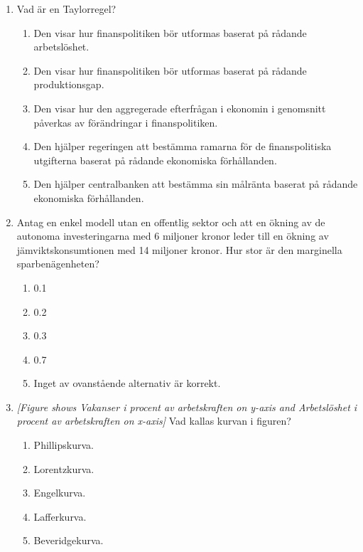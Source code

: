 \documentclass[12pt,a4paper]{article}
\begin{document}
\begin{enumerate}[label=\arabic*.]
    \item Vad är en Taylorregel?
    \begin{enumerate}[label=\alph*)]
        \item Den visar hur finanspolitiken bör utformas baserat på rådande arbetslöshet.
        \item Den visar hur finanspolitiken bör utformas baserat på rådande produktionsgap.
        \item Den visar hur den aggregerade efterfrågan i ekonomin i genomsnitt påverkas av förändringar i finanspolitiken.
        \item Den hjälper regeringen att bestämma ramarna för de finanspolitiska utgifterna baserat på rådande ekonomiska förhållanden.
        \item Den hjälper centralbanken att bestämma sin målränta baserat på rådande ekonomiska förhållanden.
    \end{enumerate}

    \item Antag en enkel modell utan en offentlig sektor och att en ökning av de autonoma investeringarna med 6 miljoner kronor leder till en ökning av jämviktskonsumtionen med 14 miljoner kronor. Hur stor är den marginella sparbenägenheten?
    \begin{enumerate}[label=\alph*)]
        \item 0.1
        \item 0.2
        \item 0.3
        \item 0.7
        \item Inget av ovanstående alternativ är korrekt.
    \end{enumerate}

    \item \textit{[Figure shows Vakanser i procent av arbetskraften on y-axis and Arbetslöshet i procent av arbetskraften on x-axis]} Vad kallas kurvan i figuren?
    \begin{enumerate}[label=\alph*)]
        \item Phillipskurva.
        \item Lorentzkurva.
        \item Engelkurva.
        \item Lafferkurva.
        \item Beveridgekurva.
    \end{enumerate}


\end{enumerate}
\end{document}

